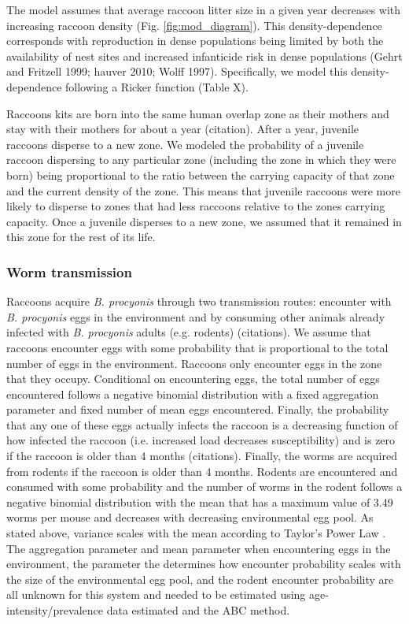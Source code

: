 \documentclass[11pt]{article}
\begin{document}
The model assumes that average raccoon litter size in a given year
decreases with increasing raccoon density (Fig. \ref{fig:mod_diagram}). This density-dependence
corresponds with reproduction in dense populations being limited by both
the availability of nest sites and increased infanticide risk in dense
populations (Gehrt and Fritzell 1999; hauver 2010; Wolff 1997).
Specifically, we model this density-dependence following a Ricker
function (Table X).

Raccoons kits are born into the same human overlap zone as their mothers and stay with their mothers for about a year (citation).  After a year, juvenile raccoons disperse to a new zone. We modeled the probability of a juvenile raccoon dispersing to any particular zone (including the zone in which they were born) being proportional to the ratio between the carrying capacity of that zone and the current density of the zone. This means that juvenile raccoons were more likely to disperse to zones that had less raccoons relative to the zones carrying capacity.  Once a juvenile disperses to a new zone, we assumed that it remained in this zone for the rest of its life. 

\subsubsection{Worm transmission}

Raccoons acquire \emph{B. procyonis} through two transmission routes:
encounter with \emph{B. procyonis} eggs in the environment and by
consuming other animals already infected with \emph{B. procyonis} adults
(e.g. rodents) (citations).  We assume that raccoons encounter eggs with some probability that is proportional to the total number of eggs in the environment. Raccoons only encounter eggs in the zone that they occupy. Conditional on encountering eggs, the total number of eggs encountered follows a negative binomial distribution with a fixed aggregation parameter and fixed number of mean eggs encountered.  Finally, the probability that any one of these eggs actually infects the raccoon is a decreasing function of how infected the raccoon (i.e. increased load decreases susceptibility) and is zero if the raccoon is older than 4 months (citations). Finally, the worms are acquired from rodents if the raccoon is older than 4 months.  Rodents are encountered and consumed with some probability and the number of worms in the rodent follows a negative binomial distribution with the mean that has a maximum value of 3.49 worms per mouse and decreases with decreasing environmental egg pool. As stated above, variance scales with the mean according to Taylor's Power Law \citep{Shaw1995}.  The aggregation parameter and mean parameter when encountering eggs in the environment, the parameter the determines how encounter probability scales with the size of the environmental egg pool, and the rodent encounter probability are all unknown for this system and needed to be estimated using age-intensity/prevalence data estimated and the ABC method.
\end{document}
